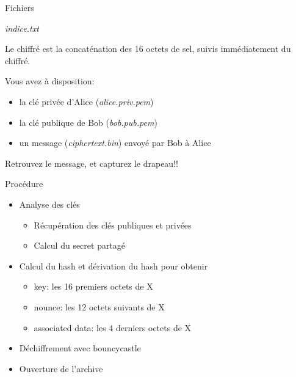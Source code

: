 \documentclass[10pt,sans,usenames,dvipsnames,french,compress]{beamer}
\begin{document}
\begin{frame}
	\begin{block}{Fichiers}
		\begin{small}
		\end{small}
	\end{block}

	\begin{block}{\textit{indice.txt}}
		\begin{small}
      Le chiffré est la concaténation des 16 octets de sel, suivis immédiatement du chiffré.

      Vous avez à disposition:
      \begin{itemize}
        \item la clé privée d'Alice (\textit{alice.priv.pem})
        \item la clé publique de Bob (\textit{bob.pub.pem})
        \item un message (\textit{ciphertext.bin}) envoyé par Bob à Alice
      \end{itemize}

      Retrouvez le message, et capturez le drapeau!!
		\end{small}
	\end{block}
\end{frame}

\begin{frame}{Procédure}
	\begin{itemize}
		\item Analyse des clés
		\begin{itemize}
			\item Récupération des clés publiques et privées
			\item Calcul du secret partagé
    \end{itemize}

		\item Calcul du hash et dérivation du hash pour obtenir
		\begin{itemize}
      \item key: les 16 premiers octets de X
      \item nounce: les 12 octets suivants de X
      \item associated data: les 4 derniers octets de X
		\end{itemize}
    \item Déchiffrement avec bouncycastle
    \item Ouverture de l'archive
	\end{itemize}
\end{frame}
\end{document}
